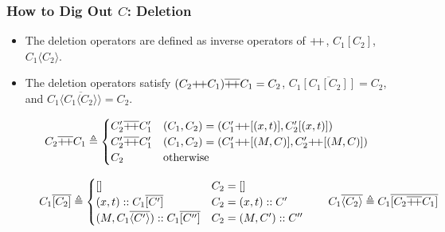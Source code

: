 \documentclass{beamer}
\newcommand*{\cons}{::}
\newcommand*{\mapinject}[2]{{#1}[{#2}]}
\newcommand*{\inject}[2]{{#1}\langle{#2}\rangle}
\newcommand*{\deletepre}[2]{{#2}\overline{+\mkern-3mu+}{#1}}
\newcommand*{\deletemap}[2]{{#1}\overline{[{#2}]}}
\newcommand*{\delete}[2]{{#1}\overline{\langle{#2}\rangle}}
\begin{document}
\begin{frame}[c]
  \frametitle{How to Dig Out $C$: Deletion}
  \begin{itemize}
    \item The deletion operators are defined as inverse operators of $+\mkern-3mu+$, $\mapinject{C_1}{C_2}$, $\inject{C_1}{C_2}$.
    \item The deletion operators satisfy $\deletepre{C_1}{(C_2{+\mkern-3mu+}C_1)}=C_2$, $\deletemap{C_1}{\mapinject{C_1}{C_2}}=C_2$, and $\delete{C_1}{\inject{C_1}{C_2}}=C_2$.
  \end{itemize}

  \begin{figure}[h!]
    \footnotesize
    \[
      \deletepre{C_{1}}{C_{2}}\triangleq
      \begin{cases}
        \deletepre{C_{1}'}{C_{2}'} & (C_{1},C_{2})=(C_{1}'{+\mkern-3mu+}[(x,t)],C_{2}'[(x,t)])               \\
        \deletepre{C_{1}'}{C_{2}'} & (C_{1},C_{2})=(C_{1}'{+\mkern-3mu+}[(M,C)],C_{2}'{+\mkern-3mu+}[(M,C)]) \\
        C_{2}                      & \text{otherwise}
      \end{cases}
    \]

    \[
      \deletemap{C_{1}}{C_{2}}\triangleq
      \begin{cases}
        []                                                 & C_{2}=[]               \\
        (x,t)\cons\deletemap{C_{1}}{C'}                    & C_{2}=(x,t):: C'       \\
        (M, \delete{C_{1}}{C'})\cons\deletemap{C_{1}}{C''} & C_{2}=(M, C')\cons C''
      \end{cases}
      \qquad
      \delete{C_{1}}{C_{2}}\triangleq \deletemap{C_{1}}{\deletepre{C_{1}}{C_{2}}}
    \]
  \end{figure}
\end{frame}
\end{document}

